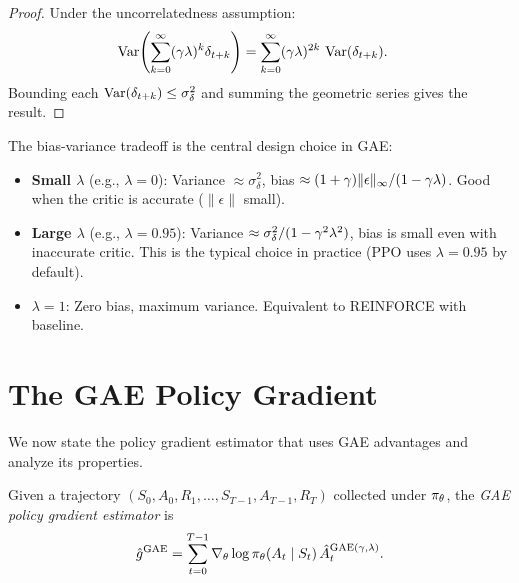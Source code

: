 \documentclass[11pt,a4paper]{article}
\begin{document}
\begin{proof}
Under the uncorrelatedness assumption:
\begin{align*}
  \operatorname{Var}\!\left(\sum_{k=0}^\infty (\gamma\lambda)^k \delta_{t+k}\right)
  &= \sum_{k=0}^\infty (\gamma\lambda)^{2k}\, \operatorname{Var}(\delta_{t+k}).
\end{align*}
Bounding each $\operatorname{Var}(\delta_{t+k}) \leq \sigma_\delta^2$ and summing the
geometric series gives the result.
\end{proof}

\begin{rlconnection}
The bias-variance tradeoff is the central design choice in GAE:
\begin{itemize}
  \item \textbf{Small $\lambda$} (e.g., $\lambda = 0$): Variance
    $\approx \sigma_\delta^2$, bias $\approx
    (1+\gamma)\|\epsilon\|_\infty / (1-\gamma\lambda)$. Good when
    the critic is accurate ($\|\epsilon\|$ small).
  \item \textbf{Large $\lambda$} (e.g., $\lambda = 0.95$): Variance
    $\approx \sigma_\delta^2 / (1-\gamma^2\lambda^2)$, bias is
    small even with inaccurate critic. This is the typical choice in
    practice (PPO uses $\lambda = 0.95$ by default).
  \item \textbf{$\lambda = 1$}: Zero bias, maximum variance. Equivalent
    to REINFORCE with baseline.
\end{itemize}
\end{rlconnection}

\section{The GAE Policy Gradient}

We now state the policy gradient estimator that uses GAE advantages
and analyze its properties.

\begin{definition}
\label{def:gae-pg}
Given a trajectory $(S_0, A_0, R_1, \ldots, S_{T-1}, A_{T-1}, R_T)$
collected under $\pi_\theta$, the \emph{GAE policy gradient
estimator} is
\[
  \hat{g}^{\mathrm{GAE}} = \sum_{t=0}^{T-1}
  \nabla_\theta \log \pi_\theta(A_t \mid S_t)\,
  \hat{A}_t^{\mathrm{GAE}(\gamma,\lambda)}.
\]
\end{definition}
\end{document}
